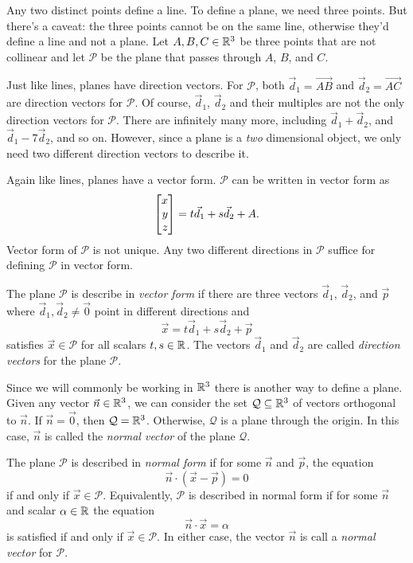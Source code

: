 Any two distinct points define a line.  To define a plane, we
need three points.  But there's a caveat: the three points cannot
be on the same line, otherwise they'd define a line
and not a plane.  Let $A,B,C\in\mathbb{R}^3$ be three points that are not
collinear and let $\mathcal P$ be the plane that passes through $A$,
$B$, and $C$.

Just like lines, planes have direction vectors.  For $\mathcal P$, both
$\vec d_1=\overrightarrow{AB}$ and $\vec d_2=\overrightarrow{AC}$ are direction
vectors for $\mathcal P$.  Of course, $\vec d_1$, $\vec d_2$ and their multiples
are not the only direction vectors for $\mathcal P$. There are infinitely many more, including
$\vec d_1+\vec d_2$, and $\vec d_1-7\vec d_2$, and so on.  However, since a plane
is a \emph{two} dimensional object, we only need two different direction vectors to describe it.

Again like lines, planes have a vector form.  $\mathcal P$ can be written in vector form as
\[
	\mat{x\\y\\z} = t\vec d_1+s\vec d_2+A.
\]
Vector form of $\mathcal P$ is not unique.  Any two different directions in $\mathcal P$
suffice for defining $\mathcal P$ in vector form.

\begin{definition}
	The plane $\mathcal P$ is describe in \emph{vector form} if there are
	three vectors $\vec d_1$, $\vec d_2$, and $\vec p$ where $\vec d_1,\vec d_2\neq \vec 0$
	point in different directions and
	\[
		\vec x=t\vec d_1+s\vec d_2+\vec p
	\]
	satisfies $\vec x\in \mathcal P$ for all scalars $t,s\in\mathbb{R}$.  The vectors $\vec d_1$
	and $\vec d_2$ are called \emph{direction vectors} for the plane $\mathcal P$.
\end{definition}

Since we will commonly be working in $\mathbb{R}^3$ there is another way to define a plane.  Given
any vector $\vec n\in\mathbb{R}^3$, we can consider the set $\mathcal Q\subseteq\mathbb{R}^3$ of vectors orthogonal to $\vec n$.
If $\vec n=\vec 0$, then $\mathcal Q=\mathbb{R}^3$.  Otherwise, $\mathcal Q$ is a plane through the origin.
In this case, $\vec n$ is called the \emph{normal vector} of the plane $\mathcal Q$.

\begin{definition}
	The plane $\mathcal P$ is described in \emph{normal form} if for some $\vec n$ and $\vec p$,
	the equation
	\[
		\vec n\cdot(\vec x-\vec p)=0
	\]
	if and only if $\vec x\in\mathcal P$.  Equivalently, $\mathcal P$ is described in normal form if
	for some $\vec n$ and scalar $\alpha\in\mathbb{R}$ the equation
	\[
		\vec n\cdot \vec x=\alpha
	\]
	is satisfied if and only if $\vec x\in \mathcal P$.  In either case, the vector $\vec n$
	is call a \emph{normal vector} for $\mathcal P$.
\end{definition}

